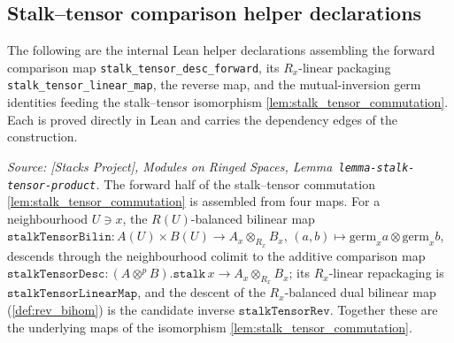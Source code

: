 \subsection{Stalk--tensor comparison helper declarations}
\label{subsec:tensorobj_stalktensor_helpers}

The following are the internal Lean helper declarations assembling the forward
comparison map \texttt{stalk\_tensor\_desc\_forward}, its \(R_x\)-linear packaging
\texttt{stalk\_tensor\_linear\_map}, the reverse map, and the mutual-inversion germ
identities feeding the stalk--tensor isomorphism \cref{lem:stalk_tensor_commutation}.
Each is proved directly in Lean and carries the dependency edges of the construction.

\begin{definition}
  \label{def:stalk_tensor_desc}
  \textit{Source: [Stacks Project], Modules on Ringed Spaces,
  Lemma~\texttt{lemma-stalk-tensor-product}.}
  The forward half of the stalk--tensor commutation \cref{lem:stalk_tensor_commutation}
  is assembled from four maps. For a neighbourhood \(U \ni x\), the \(R(U)\)-balanced
  bilinear map \(\mathtt{stalkTensorBilin}\colon A(U) \times B(U) \to A_x \otimes_{R_x}
  B_x\), \((a,b) \mapsto \mathrm{germ}_x a \otimes \mathrm{germ}_x b\), descends through
  the neighbourhood colimit to the additive comparison map \(\mathtt{stalkTensorDesc}
  \colon (A \otimes^{p} B).\mathtt{stalk}\,x \to A_x \otimes_{R_x} B_x\); its
  \(R_x\)-linear repackaging is \(\mathtt{stalkTensorLinearMap}\), and the descent of the
  \(R_x\)-balanced dual bilinear map (\cref{def:rev_bihom}) is the candidate inverse
  \(\mathtt{stalkTensorRev}\). Together these are the underlying maps of the isomorphism
  \cref{lem:stalk_tensor_commutation}.
\end{definition}
